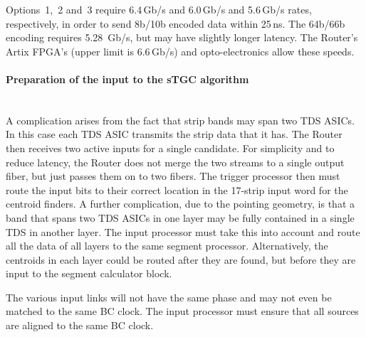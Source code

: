 Options~1,~2 and~3 require 6.4\,Gb/s and 6.0\,Gb/s and 5.6\,Gb/s rates, respectively, in order to send 8b/10b encoded data within 25\,ns.
The 64b/66b encoding requires 5.28~Gb/s, but may have slightly longer latency.
The Router's Artix FPGA's (upper limit is 6.6\,Gb/s) and opto-electronics allow these speeds.

\paragraph{Preparation of the input to the sTGC algorithm}  \hfill \\

A complication arises from the fact that strip bands may span two TDS ASICs. In this case each TDS ASIC transmits the strip data that it has.
The Router then receives two active inputs for a single candidate.
For simplicity and to reduce latency, the Router does not merge the two streams to a single output fiber, but just passes them on to two fibers.
The trigger processor then must route the input bits to their correct location in the 17-strip input word for the centroid finders.
A further complication, due to the pointing geometry, is that a band that spans two TDS ASICs in one layer may be fully contained in a single TDS in another layer.
The input processor must take this into account and route all the data of all layers to the same segment processor.
Alternatively, the centroids in each layer could be routed after they are found, but before they are input to the segment calculator block.

The various input links will not have the same phase and may not even be matched to the same BC clock. The input processor must ensure that all sources are aligned to the same BC clock.


